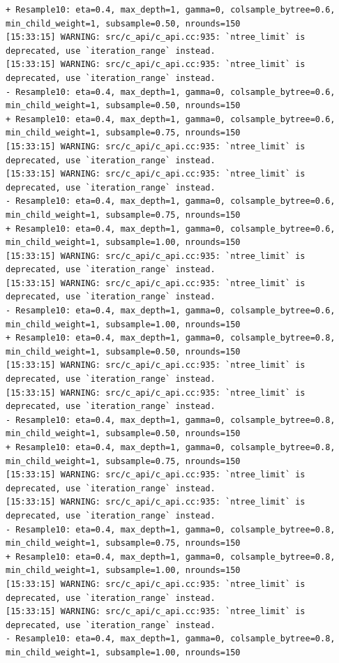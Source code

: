 \documentclass[
  letterpaper,
  DIV=11,
  numbers=noendperiod]{scrartcl}
\begin{document}
\begin{verbatim}
+ Resample10: eta=0.4, max_depth=1, gamma=0, colsample_bytree=0.6, min_child_weight=1, subsample=0.50, nrounds=150 
[15:33:15] WARNING: src/c_api/c_api.cc:935: `ntree_limit` is deprecated, use `iteration_range` instead.
[15:33:15] WARNING: src/c_api/c_api.cc:935: `ntree_limit` is deprecated, use `iteration_range` instead.
- Resample10: eta=0.4, max_depth=1, gamma=0, colsample_bytree=0.6, min_child_weight=1, subsample=0.50, nrounds=150 
+ Resample10: eta=0.4, max_depth=1, gamma=0, colsample_bytree=0.6, min_child_weight=1, subsample=0.75, nrounds=150 
[15:33:15] WARNING: src/c_api/c_api.cc:935: `ntree_limit` is deprecated, use `iteration_range` instead.
[15:33:15] WARNING: src/c_api/c_api.cc:935: `ntree_limit` is deprecated, use `iteration_range` instead.
- Resample10: eta=0.4, max_depth=1, gamma=0, colsample_bytree=0.6, min_child_weight=1, subsample=0.75, nrounds=150 
+ Resample10: eta=0.4, max_depth=1, gamma=0, colsample_bytree=0.6, min_child_weight=1, subsample=1.00, nrounds=150 
[15:33:15] WARNING: src/c_api/c_api.cc:935: `ntree_limit` is deprecated, use `iteration_range` instead.
[15:33:15] WARNING: src/c_api/c_api.cc:935: `ntree_limit` is deprecated, use `iteration_range` instead.
- Resample10: eta=0.4, max_depth=1, gamma=0, colsample_bytree=0.6, min_child_weight=1, subsample=1.00, nrounds=150 
+ Resample10: eta=0.4, max_depth=1, gamma=0, colsample_bytree=0.8, min_child_weight=1, subsample=0.50, nrounds=150 
[15:33:15] WARNING: src/c_api/c_api.cc:935: `ntree_limit` is deprecated, use `iteration_range` instead.
[15:33:15] WARNING: src/c_api/c_api.cc:935: `ntree_limit` is deprecated, use `iteration_range` instead.
- Resample10: eta=0.4, max_depth=1, gamma=0, colsample_bytree=0.8, min_child_weight=1, subsample=0.50, nrounds=150 
+ Resample10: eta=0.4, max_depth=1, gamma=0, colsample_bytree=0.8, min_child_weight=1, subsample=0.75, nrounds=150 
[15:33:15] WARNING: src/c_api/c_api.cc:935: `ntree_limit` is deprecated, use `iteration_range` instead.
[15:33:15] WARNING: src/c_api/c_api.cc:935: `ntree_limit` is deprecated, use `iteration_range` instead.
- Resample10: eta=0.4, max_depth=1, gamma=0, colsample_bytree=0.8, min_child_weight=1, subsample=0.75, nrounds=150 
+ Resample10: eta=0.4, max_depth=1, gamma=0, colsample_bytree=0.8, min_child_weight=1, subsample=1.00, nrounds=150 
[15:33:15] WARNING: src/c_api/c_api.cc:935: `ntree_limit` is deprecated, use `iteration_range` instead.
[15:33:15] WARNING: src/c_api/c_api.cc:935: `ntree_limit` is deprecated, use `iteration_range` instead.
- Resample10: eta=0.4, max_depth=1, gamma=0, colsample_bytree=0.8, min_child_weight=1, subsample=1.00, nrounds=150 

\end{verbatim}
\end{document}

